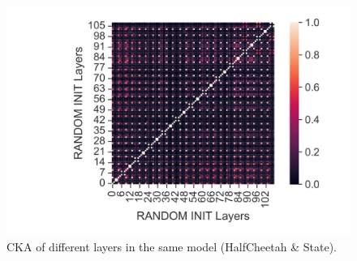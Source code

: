 \documentclass{article}
\begin{document}
\begin{figure}[H]
\begin{minipage}[b]{0.32\linewidth}
        \includegraphics[width=\linewidth]{figs/cka_40_40_dtdt_halfcheetah_medium_666_state.png}
    \end{minipage}
    \caption{CKA of different layers in the same model (HalfCheetah \& State).}
\end{figure}
\end{document}
